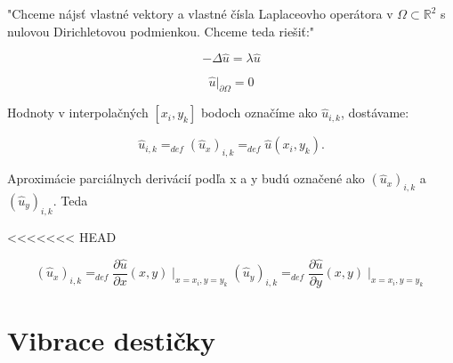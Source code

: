 \documentclass{beamer}
\begin{document}
\begin{frame}
    "Chceme nájsť vlastné vektory a vlastné čísla Laplaceovho operátora v $\Omega \subset \mathbb{R}^{2}$ s nulovou Dirichletovou podmienkou. Chceme teda riešiť:"

    \begin{subeqations}
    \label{eq:4}
    \begin{equation}
    \label{eq:5}
    -\Delta{\widehat{u}}=\lambda\widehat{u}
    \end{equation}

    \begin{equation}
    \label{eq:6}
    \widehat{u}|_{\partial{\Omega}}=0
    \end{equation}

    \end{subeqations}




    Hodnoty  v interpolačných $[x_{i},y_{k}]$ bodoch označíme ako $\widehat{u}_{i,k}$, dostávame:

    \begin{equation}
    \label{eq:6}
    \widehat{u}_{i,k}=_{def}(\widehat{u}_{x})_{i,k}=_{def}\widehat{u}(x_i,y_k).
    \end{equation}

    Aproximácie parciálnych derivácií podľa x a y budú označené ako $(\widehat{u}_{x})_{i,k}$ a $(\widehat{u}_{y})_{i,k}$. Teda

<<<<<<< HEAD


    \begin{subequations}
    \label{eq:7}
    \begin{equation}
    \label{eq:8}
    (\widehat{u}_{x})_{i,k}=_{def}\frac{\partial \widehat{u} }{\partial x}(x,y)\mid_{x=x_i,y=y_k}
    \end{equation}
    \begin{equation}
    \label{eq:9}
    (\widehat{u}_{y})_{i,k}=_{def}\frac{\partial \widehat{u} }{\partial y}(x,y)\mid_{x=x_i,y=y_k}
    \end{equation}
    \end{subequations}
\end{frame}


\section*{Vibrace destičky}
\label{sec:desticka}
\end{document}
